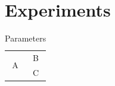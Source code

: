 \section{Experiments}
\begin{table}
\caption{Parameters}
\begin{tabular}{cc}
\toprule
\multirow{2}{*}{A} & \multicolumn{1}{c}{B} \\
& C \\
\bottomrule
\end{tabular}
\end{table}
